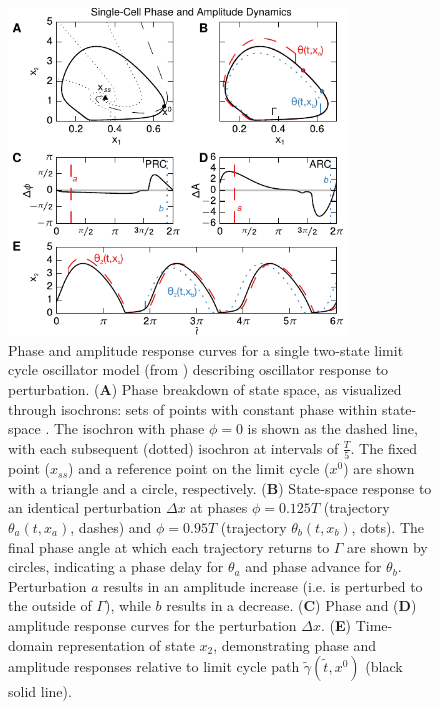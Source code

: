 \begin{figure}[p]
    \begin{center}
        \includegraphics[width=90mm]{chap1/figures/figure_2_prc_arc.pdf}
    \end{center}
    \caption{Phase and amplitude response curves for a single two-state limit cycle oscillator model (from \cite{Novak2008}) describing oscillator response to perturbation.
    (\textbf{A}) Phase breakdown of state space, as visualized through isochrons: sets of points with constant phase within state-space \cite{Doyle2006}.
    The isochron with phase $\phi=0$ is shown as the dashed line, with each subsequent (dotted) isochron at intervals of $\frac{T}{5}$.
    The fixed point ($x_{ss}$) and a reference point on the limit cycle ($x^0$) are shown with a triangle and a circle, respectively.
    (\textbf{B}) State-space response to an identical perturbation $\Delta x$ at phases $\phi = 0.125T$ (trajectory $\theta_a(t,x_a)$, dashes) and $\phi = 0.95T$ (trajectory $\theta_b(t, x_b)$, dots).
    The final phase angle at which each trajectory returns to $\Gamma$ are shown by circles, indicating a phase delay for $\theta_a$ and phase advance for $\theta_b$.
    Perturbation $a$ results in an amplitude increase (i.e. is perturbed to the outside of $\Gamma$), while $b$ results in a decrease.
    (\textbf{C}) Phase and
    (\textbf{D}) amplitude response curves for the perturbation $\Delta x$. 
    (\textbf{E}) Time-domain representation of state $x_2$, demonstrating phase and amplitude responses relative to limit cycle path $\tilde\gamma(\tilde{t},x^0)$ (black solid line).
    \label{fig:lco}}
\end{figure}

